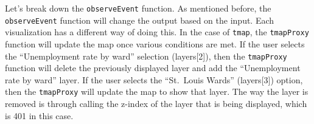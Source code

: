 \documentclass[
  krantz2]{krantz}
\makeatletter
\newenvironment{Shaded}{\begin{snugshade}}{\end{snugshade}}
\newcommand{\AttributeTok}[1]{\textcolor[rgb]{0.61,0.61,0.61}{#1}}
\newcommand{\CommentTok}[1]{\textcolor[rgb]{0.37,0.37,0.37}{\textit{#1}}}
\newcommand{\ControlFlowTok}[1]{\textcolor[rgb]{0.27,0.27,0.27}{\textbf{#1}}}
\newcommand{\DecValTok}[1]{\textcolor[rgb]{0.06,0.06,0.06}{#1}}
\newcommand{\FunctionTok}[1]{\textcolor[rgb]{0,0,0}{#1}}
\newcommand{\NormalTok}[1]{#1}
\newcommand{\OtherTok}[1]{\textcolor[rgb]{0.37,0.37,0.37}{#1}}
\newcommand{\SpecialCharTok}[1]{\textcolor[rgb]{0,0,0}{#1}}
\newcommand{\StringTok}[1]{\textcolor[rgb]{0.5,0.5,0.5}{#1}}
\newenvironment{kframe}{%
\medskip{}
\setlength{\fboxsep}{.8em}
 \def\at@end@of@kframe{}%
 \ifinner\ifhmode%
  \def\at@end@of@kframe{\end{minipage}}%
  \begin{minipage}{\columnwidth}%
 \fi\fi%
 \def\FrameCommand##1{\hskip\@totalleftmargin \hskip-\fboxsep
 \colorbox{shadecolor}{##1}\hskip-\fboxsep
     \hskip-\linewidth \hskip-\@totalleftmargin \hskip\columnwidth}%
 \MakeFramed {\advance\hsize-\width
   \@totalleftmargin\z@ \linewidth\hsize
   \@setminipage}}%
 {\par\unskip\endMakeFramed%
 \at@end@of@kframe}
\renewenvironment{Shaded}{\begin{kframe}}{\end{kframe}}
\makeatother
\begin{document}
\begin{Shaded}
\end{Shaded}

Let's break down the \texttt{observeEvent} function. As mentioned before, the \texttt{observeEvent} function will change the output based on the input. Each visualization has a different way of doing this. In the case of \texttt{tmap}, the \texttt{tmapProxy} function will update the map once various conditions are met. If the user selects the ``Unemployment rate by ward'' selection (layers{[}2{]}), then the \texttt{tmapProxy} function will delete the previously displayed layer and add the ``Unemployment rate by ward'' layer. If the user selects the ``St.~Louis Wards'' (layers{[}3{]}) option, then the \texttt{tmapProxy} will update the map to show that layer. The way the layer is removed is through calling the z-index of the layer that is being displayed, which is 401 in this case.
\end{document}

